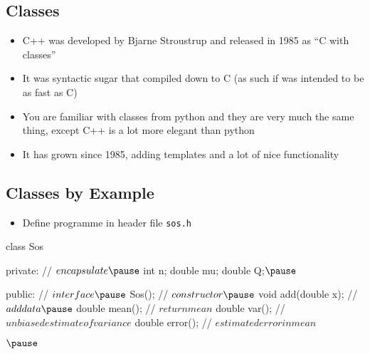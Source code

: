 
\begin{slide}
\section{Classes}

\begin{PauseHighLight}
  \begin{itemize}
  \item C++ was developed by Bjarne Stroustrup and released in 1985 as
    ``C with classes''\pause
  \item It was syntactic sugar that compiled down to C\pause{} (as
    such if was intended to be as fast as C)\pause
  \item You are familiar with classes from python and they are very
    much the same thing\pause, except C++ is a lot more elegant than
    python\pauseb
  \item It has grown since 1985, adding templates and a lot of nice
    functionality\pauseb
  \end{itemize}
\end{PauseHighLight}

\end{slide}


\begin{slide}
\section[-1]{Classes by Example}

\begin{PauseHighLight}
  \begin{itemize}
  \item Define programme in header file \texttt{sos.h}\pause
  \end{itemize}
\end{PauseHighLight}

\begin{cpp}
  class Sos {
  private:               // $encapsulate\pause$
    int n;
    double mu;
    double Q;$\pause$

  public:                 // $interface   \pause$
    Sos();                // $constructor \pause$
    void add(double x);   // $add data  \pause$
    double mean();        // $return mean$
    double var();         // $unbiased estimate of variance$
    double error();       // $estimated error in mean$
  }$\pause$
\end{cpp}
\end{slide}

